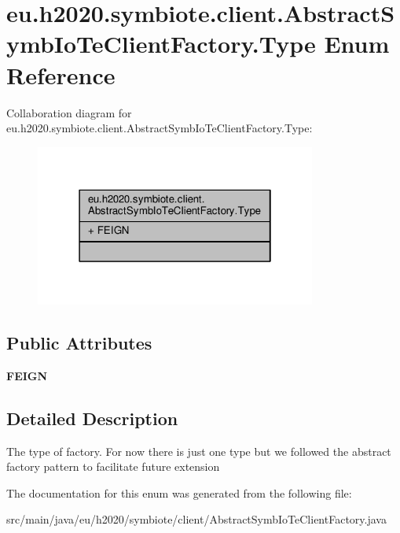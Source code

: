\hypertarget{enumeu_1_1h2020_1_1symbiote_1_1client_1_1AbstractSymbIoTeClientFactory_1_1Type}{}\section{eu.\+h2020.\+symbiote.\+client.\+Abstract\+Symb\+Io\+Te\+Client\+Factory.\+Type Enum Reference}
\label{enumeu_1_1h2020_1_1symbiote_1_1client_1_1AbstractSymbIoTeClientFactory_1_1Type}


Collaboration diagram for eu.\+h2020.\+symbiote.\+client.\+Abstract\+Symb\+Io\+Te\+Client\+Factory.\+Type\+:\nopagebreak
\begin{figure}[H]
\begin{center}
\leavevmode
\includegraphics[width=262pt]{enumeu_1_1h2020_1_1symbiote_1_1client_1_1AbstractSymbIoTeClientFactory_1_1Type__coll__graph}
\end{center}
\end{figure}
\subsection*{Public Attributes}
\begin{DoxyCompactItemize}
\item 
\mbox{\label{enumeu_1_1h2020_1_1symbiote_1_1client_1_1AbstractSymbIoTeClientFactory_1_1Type_ac3f80a0f063a51689cfb61173017ad7f}} 
{\bfseries F\+E\+I\+GN}
\end{DoxyCompactItemize}


\subsection{Detailed Description}
The type of factory. For now there is just one type but we followed the abstract factory pattern to facilitate future extension 

The documentation for this enum was generated from the following file\+:\begin{DoxyCompactItemize}
\item 
src/main/java/eu/h2020/symbiote/client/Abstract\+Symb\+Io\+Te\+Client\+Factory.\+java\end{DoxyCompactItemize}
